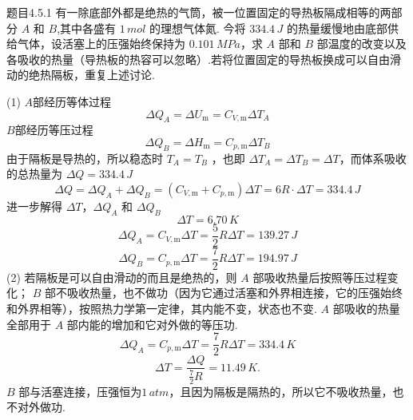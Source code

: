 \begin{question}{题目4.5.1}
    有一除底部外都是绝热的气筒，被一位置固定的导热板隔成相等的两部分 $A$ 和 $B$,其中各盛有 $1 \,\si{mol}$ 的理想气体氮. 今将 $334.4\,\si{J}$ 的热量缓慢地由底部供给气体，设活塞上的压强始终保持为 $0. 101 \,\si{MPa}$，求 $A$ 部和 $B$ 部温度的改变以及各吸收的热量（导热板的热容可以忽略）.若将位置固定的导热板换成可以自由滑动的绝热隔板，重复上述讨论.
\end{question}
\begin{solution}
    (1) $A$部经历等体过程
    $$
        \Delta Q_A = \Delta U_\mathrm{m} = C_{V,\mathrm{m}}\Delta{T_A}
    $$
    $B$部经历等压过程
    $$
        \Delta Q_B = \Delta H_\mathrm{m} = C_{p,\mathrm{m}}\Delta{T_B}
    $$
    由于隔板是导热的，所以稳态时 $T_A = T_B$ ，也即 $\Delta T_A = \Delta T_B = \Delta T$，而体系吸收的总热量为 $\Delta Q = 334.4 \,\si{J}$
    $$
        \Delta Q = \Delta{Q_A} + \Delta{Q_B}
        = (C_{V,\mathrm{m}} +C_{p,\mathrm{m}})\Delta{T}
        = 6R \cdot \Delta{T}
        =  334.4 \,\si{J}
    $$
    进一步解得 $\Delta T$，$\Delta Q_A$ 和 $\Delta Q_B$
    $$
        \Delta T = 6.70 \,\si{K}
    $$
    $$
        \Delta Q_A = C_{V,\mathrm{m}}\Delta{T} = \frac{5}{2}R\Delta{T} = 139.27 \,\si{J}
    $$
    $$
        \Delta Q_B = C_{p,\mathrm{m}}\Delta{T} = \frac{7}{2}R\Delta{T} = 194.97 \,\si{J}
    $$
    (2) 若隔板是可以自由滑动的而且是绝热的，则 $A$ 部吸收热量后按照等压过程变化； $B$ 部不吸收热量，也不做功（因为它通过活塞和外界相连接，它的压强始终和外界相等），按照热力学第一定律，其内能不变，状态也不变. $A$ 部吸收的热量全部用于 $A$ 部内能的增加和它对外做的等压功.
    $$
        \Delta Q_A = C_{p,\mathrm{m}} \Delta{T}
        = \frac{7}{2}R\Delta{T} = 334.4 \,\si{K}
    $$
    $$
        \Delta T = \frac{\Delta Q}{\frac{7}{2}R}
        = 11.49 \,\si{K}.
    $$
    $B$ 部与活塞连接，压强恒为$1 \,\si{atm}$，且因为隔板是隔热的，所以它不吸收热量，也不对外做功.
\end{solution}

